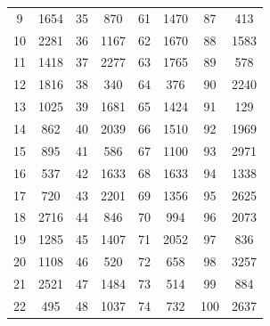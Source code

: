 \begin{center}
\begin{tabular}{|c|c||c|c||c|c||c|c|}
        9           & 1654                & 35          & 870                 & 61          & 1470                & 87          & 413                 \\
        10          & 2281                & 36          & 1167                & 62          & 1670                & 88          & 1583                \\
        11          & 1418                & 37          & 2277                & 63          & 1765                & 89          & 578                 \\
        12          & 1816                & 38          & 340                 & 64          & 376                 & 90          & 2240                \\
        13          & 1025                & 39          & 1681                & 65          & 1424                & 91          & 129                 \\
        14          & 862                 & 40          & 2039                & 66          & 1510                & 92          & 1969                \\
        15          & 895                 & 41          & 586                 & 67          & 1100                & 93          & 2971                \\
        16          & 537                 & 42          & 1633                & 68          & 1633                & 94          & 1338                \\
        17          & 720                 & 43          & 2201                & 69          & 1356                & 95          & 2625                \\
        18          & 2716                & 44          & 846                 & 70          & 994                 & 96          & 2073                \\
        19          & 1285                & 45          & 1407                & 71          & 2052                & 97          & 836                 \\
        20          & 1108                & 46          & 520                 & 72          & 658                 & 98          & 3257                \\
        21          & 2521                & 47          & 1484                & 73          & 514                 & 99          & 884                 \\
        22          & 495                 & 48          & 1037                & 74          & 732                 & 100         & 2637                \\

\end{tabular}
\end{center}
